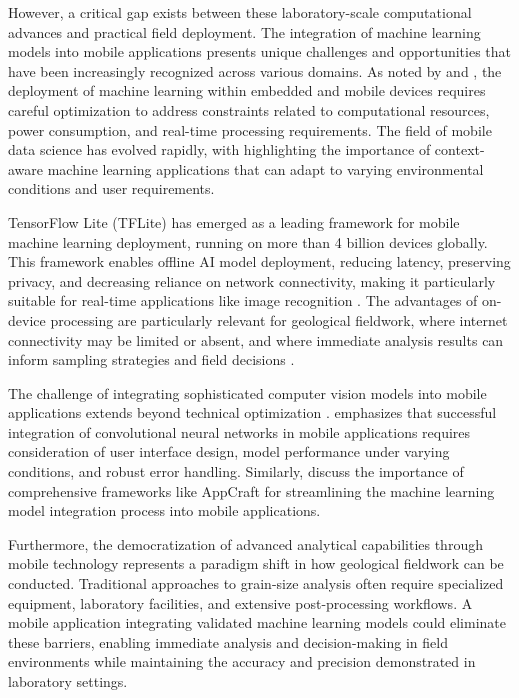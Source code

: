 \documentclass[project-plan]{report-template}
\begin{document}
However, a critical gap exists between these laboratory-scale computational advances and practical field deployment. The integration of machine learning models into mobile applications presents unique challenges and opportunities that have been increasingly recognized across various domains. As noted by \cite{Ajani2021} and \cite{Lane2017}, the deployment of machine learning within embedded and mobile devices requires careful optimization to address constraints related to computational resources, power consumption, and real-time processing requirements. The field of mobile data science has evolved rapidly, with \cite{Iqbal2020, Iqbal2021} highlighting the importance of context-aware machine learning applications that can adapt to varying environmental conditions and user requirements.

TensorFlow Lite (TFLite) has emerged as a leading framework for mobile machine learning deployment, running on more than 4 billion devices globally. This framework enables offline AI model deployment, reducing latency, preserving privacy, and decreasing reliance on network connectivity, making it particularly suitable for real-time applications like image recognition \citep{Channonthawat2016}. The advantages of on-device processing are particularly relevant for geological fieldwork, where internet connectivity may be limited or absent, and where immediate analysis results can inform sampling strategies and field decisions \citep{Veeramani2022, Dai2020}.

The challenge of integrating sophisticated computer vision models into mobile applications extends beyond technical optimization \cite{Arpteg2018}. \cite{Roger2021} emphasizes that successful integration of convolutional neural networks in mobile applications requires consideration of user interface design, model performance under varying conditions, and robust error handling. Similarly, \cite{Lyan2023} discuss the importance of comprehensive frameworks like AppCraft for streamlining the machine learning model integration process into mobile applications.

Furthermore, the democratization of advanced analytical capabilities through mobile technology represents a paradigm shift in how geological fieldwork can be conducted. Traditional approaches to grain-size analysis often require specialized equipment, laboratory facilities, and extensive post-processing workflows. A mobile application integrating validated machine learning models could eliminate these barriers, enabling immediate analysis and decision-making in field environments while maintaining the accuracy and precision demonstrated in laboratory settings.
\end{document}
